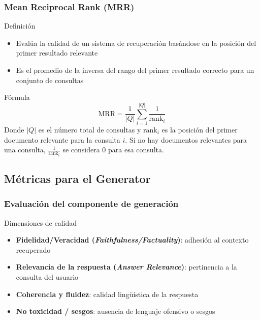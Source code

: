 \documentclass[handout]{beamer}
\begin{document}
\begin{frame}
  \frametitle{Mean Reciprocal Rank (MRR)}
  \begin{block}{Definición}
    \begin{itemize}
        \item Evalúa la calidad de un sistema de recuperación basándose en la posición del primer resultado relevante
        \item Es el promedio de la inversa del rango del primer resultado correcto para un conjunto de consultas
    \end{itemize}
  \end{block}
  \begin{block}{Fórmula}
    \[ \text{MRR} = \frac{1}{|Q|} \sum_{i=1}^{|Q|} \frac{1}{\text{rank}_i} \]
    Donde \(|Q|\) es el número total de consultas y \(\text{rank}_i\) es la posición del primer documento relevante para la consulta \(i\). Si no hay documentos relevantes para una consulta, \(\frac{1}{\text{rank}_i}\) se considera 0 para esa consulta.
  \end{block}
\end{frame}

\subsection{Métricas para el Generator}
\begin{frame}
  \frametitle{Evaluación del componente de generación}
    \begin{block}{Dimensiones de calidad}
        \begin{itemize}
            \item \textbf{Fidelidad/Veracidad (\textit{Faithfulness/Factuality})}: adhesión al contexto recuperado
            \item \textbf{Relevancia de la respuesta (\textit{Answer Relevance})}: pertinencia a la consulta del usuario
            \item \textbf{Coherencia y fluidez}: calidad lingüística de la respuesta
            \item \textbf{No toxicidad / sesgos}: ausencia de lenguaje ofensivo o sesgos
        \end{itemize}
    \end{block}
\end{frame}


\end{document}
